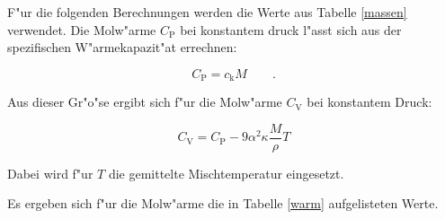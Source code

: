 

F"ur die folgenden Berechnungen werden die Werte aus Tabelle \ref{massen} verwendet.
Die Molw"arme $C_\mathrm{P}$ bei konstantem druck l"asst sich aus der spezifischen W"armekapazit"at errechnen:

\begin{equation}
	C_\mathrm{P} = c_\mathrm{k} M \qquad .
\end{equation}

Aus dieser Gr"o"se ergibt sich f"ur die Molw"arme $C_\mathrm{V}$ bei konstantem Druck:

\begin{equation}
		C_\mathrm{V} = C_\mathrm{P} - 9 \alpha^2 \kappa \frac{M}{\rho} T
\end{equation}

Dabei wird f"ur $T$ die gemittelte Mischtemperatur eingesetzt.

Es ergeben sich f"ur die Molw"arme die in Tabelle \ref{warm} aufgelisteten Werte.

